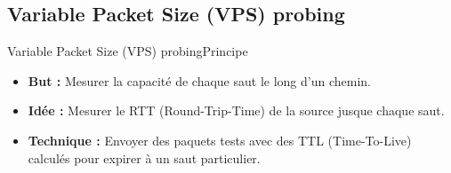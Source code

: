 \documentclass[compress]{beamer}
\begin{document}
\subsection{Variable Packet Size (VPS) probing}
\begin{frame}{Variable Packet Size (VPS) probing}{Principe}
\begin{itemize}
\pause 
\item \textbf{But :}  Mesurer la {\color{red}capacité} de chaque saut le long d'un chemin.
\pause
\item \textbf{Idée :}  Mesurer le {\color{red}RTT} (Round-Trip-Time) de la source jusque chaque saut.
\pause
\item \textbf{Technique :} Envoyer des paquets tests avec des {\color{red}TTL} (Time-To-Live) calculés pour expirer à un saut particulier. 
\end{itemize}

%
%	
%	
%

\end{frame}

\end{document}
